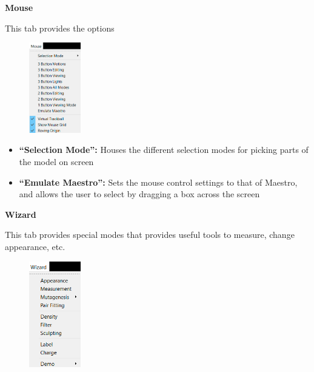 \documentclass{article}
\begin{document}
\begin{center}
    \Large \textbf{Mouse}
\end{center}

This tab provides the options \\

\begin{figure}[h!]
    \centering
    \includegraphics[width=0.2\textwidth]{workshops/pymol/imgs/mousetab.png}
    \caption[]{}
    \label{mousetab}
\end{figure}

\begin{itemize}

\item \textbf{“Selection Mode”:} Houses the different selection modes for picking parts of the model on screen

\item \textbf{“Emulate Maestro”:} Sets the mouse control settings to that of Maestro, and allows the user to select by dragging a box across the screen


\end{itemize}


\begin{center}
    \Large \textbf{Wizard}
\end{center}

This tab provides special modes that provides useful tools to measure, change appearance, etc. 
 \\

\begin{figure}[h!]
    \centering
    \includegraphics[width=0.2\textwidth]{workshops/pymol/imgs/wizardtab.png}
    \caption[]{}
    \label{wizardtab}
\end{figure}
\end{document}
